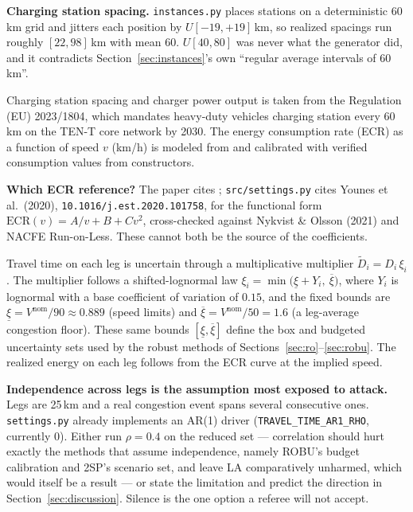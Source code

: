 \begin{acode}
\textbf{Charging station spacing.} \texttt{instances.py} places stations on a
deterministic 60\,km grid and jitters each position by $U[-19,+19]$\,km, so
realized spacings run roughly $[22,98]$\,km with mean 60. $U[40,80]$ was never
what the generator did, and it contradicts Section~\ref{sec:instances}'s own
``regular average intervals of 60\,km''.
\end{acode}

Charging station spacing and charger power output is taken from the Regulation (EU) 2023/1804, which mandates heavy-duty vehicles charging station every 60 km on the TEN-T core network by 2030. The energy consumption rate (ECR) as a function of speed $v$ (km/h) is modeled from \citet{gao_estimating_2025} and calibrated with verified consumption values from constructors.

\begin{acode}
\textbf{Which ECR reference?} The paper cites \citet{gao_estimating_2025};
\texttt{src/settings.py} cites Younes et al.\ (2020),
\texttt{10.1016/j.est.2020.101758}, for the functional form
$\mathrm{ECR}(v) = A/v + B + Cv^2$, cross-checked against Nykvist \& Olsson
(2021) and NACFE Run-on-Less. These cannot both be the source of the
coefficients. 
\end{acode}

Travel time on each leg is uncertain through a multiplicative multiplier $\tilde D_i = D_i\,\xi_i$. The multiplier follows a shifted-lognormal law $\xi_i = \min\!\bigl(\underline\xi + Y_i,\ \overline\xi\bigr)$, where $Y_i$ is lognormal with a base coefficient of variation of $0.15$, and the fixed bounds are $\underline\xi = V^{\mathrm{nom}}/90 \approx 0.889$ (speed limits) and $\overline\xi = V^{\mathrm{nom}}/50 = 1.6$ (a leg-average congestion floor). These same bounds $[\underline\xi,\overline\xi]$ define the box and budgeted uncertainty sets used by the robust methods of Sections~\ref{sec:ro}--\ref{sec:robu}. The realized energy on each leg follows from the ECR curve at the implied speed. 

\begin{atodo}
\textbf{Independence across legs is the assumption most exposed to attack.} Legs
are 25\,km and a real congestion event spans several consecutive ones.
\texttt{settings.py} already implements an AR(1) driver
(\texttt{TRAVEL\_TIME\_AR1\_RHO}, currently 0). Either run $\rho = 0.4$ on the
reduced set --- correlation should hurt exactly the methods that assume
independence, namely ROBU's budget calibration and 2SP's scenario set, and leave
LA comparatively unharmed, which would itself be a result --- or state the
limitation and predict the direction in Section~\ref{sec:discussion}. Silence is
the one option a referee will not accept.
\end{atodo}

